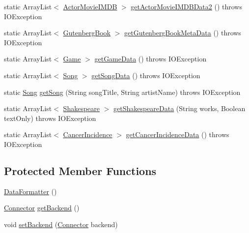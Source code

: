 \begin{DoxyCompactItemize}
\item 
static Array\+List$<$ \mbox{\hyperlink{classbridges_1_1data__src__dependent_1_1_actor_movie_i_m_d_b}{Actor\+Movie\+I\+M\+DB}} $>$ \mbox{\hyperlink{classbridges_1_1connect_1_1_data_formatter_a9b599616c4d7a502f9fab8663173db6d}{get\+Actor\+Movie\+I\+M\+D\+B\+Data2}} ()  throws I\+O\+Exception 
\item 
static Array\+List$<$ \mbox{\hyperlink{classbridges_1_1data__src__dependent_1_1_gutenberg_book}{Gutenberg\+Book}} $>$ \mbox{\hyperlink{classbridges_1_1connect_1_1_data_formatter_a4bd21bd830238db40b511474afc77b61}{get\+Gutenberg\+Book\+Meta\+Data}} ()  throws I\+O\+Exception 
\item 
static Array\+List$<$ \mbox{\hyperlink{classbridges_1_1data__src__dependent_1_1_game}{Game}} $>$ \mbox{\hyperlink{classbridges_1_1connect_1_1_data_formatter_a4098317468be22b4284156d6cd2212e1}{get\+Game\+Data}} ()  throws I\+O\+Exception 
\item 
static Array\+List$<$ \mbox{\hyperlink{classbridges_1_1data__src__dependent_1_1_song}{Song}} $>$ \mbox{\hyperlink{classbridges_1_1connect_1_1_data_formatter_a6a2ded4ccec11234434b83a3e408fb67}{get\+Song\+Data}} ()  throws I\+O\+Exception 
\item 
static \mbox{\hyperlink{classbridges_1_1data__src__dependent_1_1_song}{Song}} \mbox{\hyperlink{classbridges_1_1connect_1_1_data_formatter_ad1d2071025ce9daa42ab69af8eb4749b}{get\+Song}} (String song\+Title, String artist\+Name)  throws I\+O\+Exception 
\item 
static Array\+List$<$ \mbox{\hyperlink{classbridges_1_1data__src__dependent_1_1_shakespeare}{Shakespeare}} $>$ \mbox{\hyperlink{classbridges_1_1connect_1_1_data_formatter_ac090a4d67b38b9649bf811906f9a630a}{get\+Shakespeare\+Data}} (String works, Boolean text\+Only)  throws I\+O\+Exception 
\item 
static Array\+List$<$ \mbox{\hyperlink{classbridges_1_1data__src__dependent_1_1_cancer_incidence}{Cancer\+Incidence}} $>$ \mbox{\hyperlink{classbridges_1_1connect_1_1_data_formatter_af26cb09a93bf326fe14ad8fecf46b4f8}{get\+Cancer\+Incidence\+Data}} ()  throws I\+O\+Exception 
\end{DoxyCompactItemize}
\subsection*{Protected Member Functions}
\begin{DoxyCompactItemize}
\item 
\mbox{\hyperlink{classbridges_1_1connect_1_1_data_formatter_a31efd2251e98942e58e743dff213ef27}{Data\+Formatter}} ()
\item 
\mbox{\hyperlink{classbridges_1_1connect_1_1_connector}{Connector}} \mbox{\hyperlink{classbridges_1_1connect_1_1_data_formatter_a29cf4c2b0c5629d63a76b60569355c65}{get\+Backend}} ()
\item 
void \mbox{\hyperlink{classbridges_1_1connect_1_1_data_formatter_af9b878e5c092234a6ab5f8c11bee1fbd}{set\+Backend}} (\mbox{\hyperlink{classbridges_1_1connect_1_1_connector}{Connector}} backend)
\end{DoxyCompactItemize}



